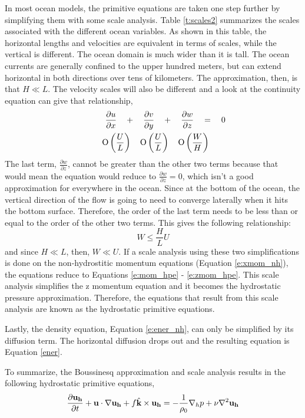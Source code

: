 In most ocean models, the primitive equations are taken one step further by simplifying them with some scale analysis.  Table \protect \ref{t:scales2} summarizes the scales associated with the different ocean variables.  As shown in this table, the horizontal lengths and velocities are equivalent in terms of scales, while the vertical is different.  The ocean domain is much wider than it is tall.  The ocean currents are generally confined to the upper hundred meters, but can extend horizontal in both directions over tens of kilometers.  The approximation, then, is that $H \ll L$.  The velocity scales will also be different and a look at the continuity equation can give that relationship, 
%
\begin{align*}
\quad \qquad \frac{\partial u}{\partial x}  \quad +  \quad    \frac{\partial v}{\partial y}  \quad    +    \quad  \frac{\partial w}{\partial z} \quad = \quad 0\\
{\rm O}\left(\frac{U}{L}\right) \quad {\rm O}\left(\frac{U}{L}\right) \quad {\rm O}\left(\frac{W}{H}\right) \qquad 
\end{align*}
%
The last term, $\frac{\partial w}{\partial z}$, cannot be greater than the other two terms because that would mean the equation would reduce to $\frac{\partial w}{\partial z}=0$, which isn't a good approximation for everywhere in the ocean.  Since at the bottom of the ocean, the vertical direction of the flow is going to need to converge laterally when it hits the bottom surface.  Therefore, the order of the last term needs to be less than or equal to the order of the other two terms. This gives the following relationship:
%
\[W \leq \frac{H}{L} U\]
%
and since $H \ll L$, then, $W \ll U$.  If a scale analysis using these two simplifications is done on the non-hydrostitic momentum equations (Equation \ref{e:xmom_nh}), the equations reduce to Equations \protect \ref{e:mom_hpe} - \ref{e:zmom_hpe}.  This scale analysis simplifies the z momentum equation and it becomes the hydrostatic pressure approximation.  Therefore, the equations that result from this scale analysis are known as the hydrostatic primitive equations.  

Lastly, the density equation, Equation \ref{e:ener_nh}, can only be simplified by its diffusion term.  The horizontal diffusion drops out and the resulting equation is Equation \protect \ref{ener}.

To summarize, the Boussinesq approximation and scale analysis results in the following hydrostatic primitive equations,
%
\begin{equation}\label{e:mom_hpe}
    \frac{\partial {\bf u_h}}{\partial t} + {\bf u} \cdot \nabla {\bf u_h} + f  \hat{\bf k} \times {\bf u_h}= - \frac{1}{\rho_0} \nabla_h p +  \nu \nabla^{2} {\bf u_h}
\end{equation}

